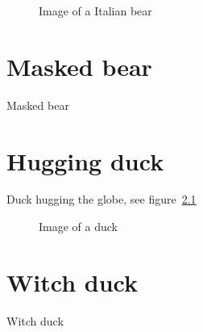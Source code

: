 \begin{figure}
\caption{Image of a Italian bear\label{fig:italianbear}}
\end{figure}

\chapter{Masked bear}

Masked bear


\cleardoublepage


\chapter{Hugging duck}

Duck hugging the globe, see figure~\ref{fig:duck}

\begin{figure}
\caption{Image of a duck\label{fig:duck}}
\end{figure}


\chapter{Witch duck}

Witch duck


